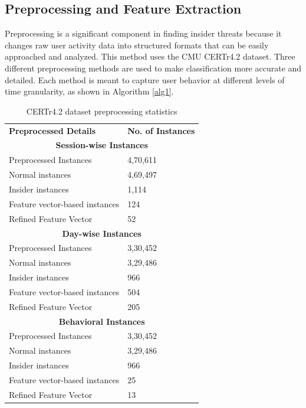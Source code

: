 \subsection{Preprocessing and Feature Extraction}
Preprocessing is a significant component in finding insider threats because it changes raw user activity data into structured formats that can be easily approached and analyzed.  This method uses the CMU CERTr4.2 dataset.  Three different preprocessing methods are used to make classification more accurate and detailed. Each method is meant to capture user behavior at different levels of time granularity, as shown in Algorithm \ref{alg1}.
\begin{table}[!ht]
\centering
\caption{CERTr4.2 dataset preprocessing statistics}
\begin{tabular}{p{9cm} p{4cm}}
\cmidrule(lr){1-2}
\textbf{Preprocessed Details} & \textbf{No. of Instances} \\ \cmidrule(lr){1-2}

\multicolumn{2}{c}{\textbf{Session-wise Instances}}\\
\cmidrule(lr){1-2}
Preprocessed Instances & 4,70,611 \\
\cmidrule(lr){1-2}
Normal instances & 4,69,497\\ 
\cmidrule(lr){1-2}
Insider instances & 1,114\\ 
\cmidrule(lr){1-2}
Feature vector-based instances & 124\\ 
\cmidrule(lr){1-2}
Refined Feature Vector & 52\\ 
\cmidrule(lr){1-2}

\multicolumn{2}{c}{\textbf{Day-wise Instances}} \\
\cmidrule(lr){1-2}
Preprocessed Instances & 3,30,452 \\
\cmidrule(lr){1-2}
Normal instances & 3,29,486\\ 
\cmidrule(lr){1-2}
Insider instances & 966\\ 
\cmidrule(lr){1-2}
Feature vector-based instances & 504\\ 
\cmidrule(lr){1-2}
Refined Feature Vector & 205\\ 
\cmidrule(lr){1-2}
\multicolumn{2}{c}{\textbf{Behavioral Instances}}  \\
\cmidrule(lr){1-2}
Preprocessed Instances & 3,30,452 \\
\cmidrule(lr){1-2}
Normal instances & 3,29,486\\ 
\cmidrule(lr){1-2}
Insider instances & 966\\ 
\cmidrule(lr){1-2}
Feature vector-based instances & 25\\
\cmidrule(lr){1-2}
Refined Feature Vector & 13\\ 
\cmidrule(lr){1-2}

\end{tabular}
\label{tab4}
\end{table}

